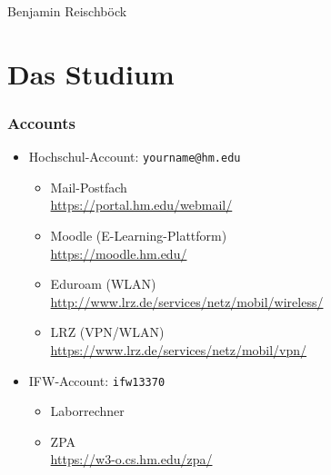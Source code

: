 \documentclass{beamer}
\begin{document}
\begin{frame}
\begin{center}
\vspace{0.1cm}

Benjamin Reischböck

\end{center}
\end{frame}


\section{Das Studium}
\begin{frame}
\frametitle{Accounts}

\begin{itemize}
	\item Hochschul-Account: \texttt{yourname@hm.edu}
		\begin{itemize}
			\item Mail-Postfach\\
				\footnotesize\url{https://portal.hm.edu/webmail/}\small
			\pause
			\item Moodle (E-Learning-Plattform)\\
				\footnotesize\url{https://moodle.hm.edu/}\small
			\pause
			\item Eduroam (WLAN)\\
				\footnotesize\url{http://www.lrz.de/services/netz/mobil/wireless/}\small
			\pause
			\item LRZ (VPN/WLAN)\\
				\footnotesize\url{https://www.lrz.de/services/netz/mobil/vpn/}\small
		\end{itemize}
	\pause
	\item IFW-Account: \texttt{ifw13370}
		\begin{itemize}
			\item Laborrechner
			\pause
			\item ZPA\\
				\footnotesize\url{https://w3-o.cs.hm.edu/zpa/}\small
		\end{itemize}
\end{itemize}
\end{frame}
\end{document}
